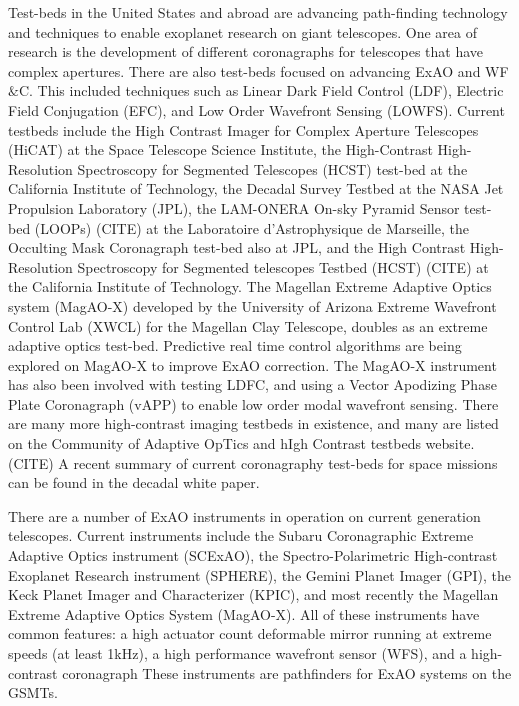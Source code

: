 Test-beds in the United States and abroad are advancing path-finding technology and techniques to enable exoplanet research on giant telescopes. One area of research is the development of different coronagraphs for telescopes that have complex apertures. There are also test-beds focused on advancing ExAO and WF$\&$C. This included techniques such as Linear Dark Field Control (LDF), Electric Field Conjugation (EFC), and Low Order Wavefront Sensing (LOWFS). Current testbeds include the High Contrast Imager for Complex Aperture Telescopes (HiCAT)\cite{2014SPIE.9143E..27N} at the Space Telescope Science Institute, the High-Contrast High-Resolution Spectroscopy for Segmented Telescopes (HCST)\cite{jovanovic2018high} test-bed at the California Institute of Technology, the Decadal Survey Testbed\cite{belikov2014ames} at the NASA Jet Propulsion Laboratory (JPL), the LAM-ONERA On-sky Pyramid Sensor test-bed (LOOPs) (CITE) at the Laboratoire d'Astrophysique de Marseille, the Occulting Mask Coronagraph\cite{shi2017dynamic} test-bed also at JPL, and the High Contrast High- Resolution Spectroscopy for Segmented telescopes Testbed (HCST) (CITE) at the California Institute of Technology. The Magellan Extreme Adaptive Optics system (MagAO-X)\cite{males2020magao} developed by the University of Arizona Extreme Wavefront Control Lab (XWCL) for the Magellan Clay Telescope, doubles as an extreme adaptive optics test-bed. Predictive real time control algorithms are being explored on MagAO-X to improve ExAO correction.\cite{haffert2021data} The MagAO-X instrument has also been involved with testing LDFC, and using a Vector Apodizing Phase Plate Coronagraph (vAPP)\cite{snik2012vector} to enable low order modal wavefront sensing.\cite{2019JATIS...5d9004M}  There are many more high-contrast imaging testbeds in existence, and many are listed on the Community of Adaptive OpTics and hIgh Contrast testbeds website.(CITE) A recent summary of current coronagraphy test-beds for space missions can be found in the decadal white paper.\cite{mazoyer2019high}


There are a number of ExAO instruments in operation on current generation telescopes. Current instruments include the Subaru Coronagraphic Extreme Adaptive Optics instrument (SCExAO)\cite{jovanovic2015subaru}, the Spectro-Polarimetric High-contrast Exoplanet Research instrument (SPHERE)\cite{beuzit2008sphere}, the Gemini Planet Imager (GPI)\cite{macintosh2014first}, the Keck Planet Imager and Characterizer (KPIC)\cite{jovanovic2019keck}, and most recently the Magellan Extreme Adaptive Optics System (MagAO-X)\cite{males2020magao}. All of these instruments have common features: a high actuator count deformable mirror running at extreme speeds (at least 1kHz), a high performance wavefront sensor (WFS), and a high-contrast coronagraph These instruments are pathfinders for ExAO systems on the GSMTs.

